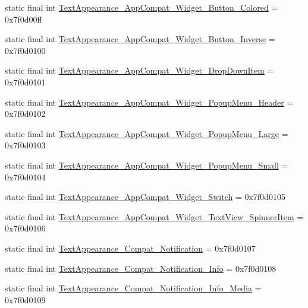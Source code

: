 \begin{DoxyCompactItemize}
\item 
static final int \mbox{\hyperlink{classandroid_1_1support_1_1design_1_1R_1_1style_a733e1e98437c5657d194de9d0d94f9be}{Text\+Appearance\+\_\+\+App\+Compat\+\_\+\+Widget\+\_\+\+Button\+\_\+\+Colored}} = 0x7f0d00ff
\item 
static final int \mbox{\hyperlink{classandroid_1_1support_1_1design_1_1R_1_1style_ae2c7ba38fc4c6f627225328c5e11bde9}{Text\+Appearance\+\_\+\+App\+Compat\+\_\+\+Widget\+\_\+\+Button\+\_\+\+Inverse}} = 0x7f0d0100
\item 
static final int \mbox{\hyperlink{classandroid_1_1support_1_1design_1_1R_1_1style_a85111e6e10aa78550520255cf9807a59}{Text\+Appearance\+\_\+\+App\+Compat\+\_\+\+Widget\+\_\+\+Drop\+Down\+Item}} = 0x7f0d0101
\item 
static final int \mbox{\hyperlink{classandroid_1_1support_1_1design_1_1R_1_1style_a967c5cd773fb811beca02b78c978368a}{Text\+Appearance\+\_\+\+App\+Compat\+\_\+\+Widget\+\_\+\+Popup\+Menu\+\_\+\+Header}} = 0x7f0d0102
\item 
static final int \mbox{\hyperlink{classandroid_1_1support_1_1design_1_1R_1_1style_ac31cc585803346f3237a75da48107a04}{Text\+Appearance\+\_\+\+App\+Compat\+\_\+\+Widget\+\_\+\+Popup\+Menu\+\_\+\+Large}} = 0x7f0d0103
\item 
static final int \mbox{\hyperlink{classandroid_1_1support_1_1design_1_1R_1_1style_a4be044c1dccfdfd0fc8caef81efad1bd}{Text\+Appearance\+\_\+\+App\+Compat\+\_\+\+Widget\+\_\+\+Popup\+Menu\+\_\+\+Small}} = 0x7f0d0104
\item 
static final int \mbox{\hyperlink{classandroid_1_1support_1_1design_1_1R_1_1style_a235664d14c9d1c9eb319a06fca1e7647}{Text\+Appearance\+\_\+\+App\+Compat\+\_\+\+Widget\+\_\+\+Switch}} = 0x7f0d0105
\item 
static final int \mbox{\hyperlink{classandroid_1_1support_1_1design_1_1R_1_1style_ad467a646dc2a35f3211088174bdaa35a}{Text\+Appearance\+\_\+\+App\+Compat\+\_\+\+Widget\+\_\+\+Text\+View\+\_\+\+Spinner\+Item}} = 0x7f0d0106
\item 
static final int \mbox{\hyperlink{classandroid_1_1support_1_1design_1_1R_1_1style_a487414a4cbdc32b80697b782ccfed21a}{Text\+Appearance\+\_\+\+Compat\+\_\+\+Notification}} = 0x7f0d0107
\item 
static final int \mbox{\hyperlink{classandroid_1_1support_1_1design_1_1R_1_1style_a0fb52461a8264f9e9553368f5ccdc2bd}{Text\+Appearance\+\_\+\+Compat\+\_\+\+Notification\+\_\+\+Info}} = 0x7f0d0108
\item 
static final int \mbox{\hyperlink{classandroid_1_1support_1_1design_1_1R_1_1style_ae10a31bb7a17822b305d01fca629f8db}{Text\+Appearance\+\_\+\+Compat\+\_\+\+Notification\+\_\+\+Info\+\_\+\+Media}} = 0x7f0d0109

\end{DoxyCompactItemize}
